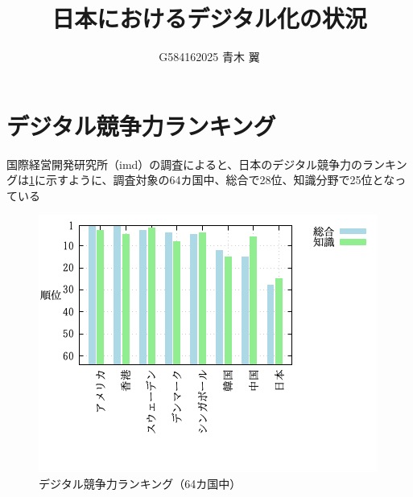 \documentclass[a4paper,11pt,dvipdfmx]{ujarticle}
\title{日本におけるデジタル化の状況}
\author{G584162025 青木 翼}
\begin{document}
\maketitle %
\section{デジタル競争力ランキング}

 国際経営開発研究所（imd）の調査\cite{imd}によると、日本のデジタル競争力のランキングは\ref{fig:保持率}に示すように、調査対象の64カ国中、総合で28位、知識分野で25位となっている

\begin{figure}[htbp]
    \centering
    \includegraphics{fig31.png}

\caption{デジタル競争力ランキング（64カ国中）} \label{fig:保持率}
\end{figure}

\end{document}
